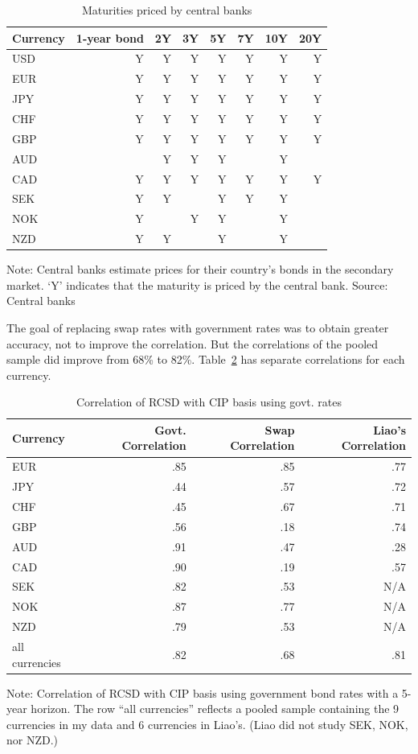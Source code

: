 \begin{table}[H]
\caption{\label{govt_maturities} Maturities priced by central banks
}
\centering
\begin{tabular}{ |l|r|r|r|r|r|r|r| }
\hline
Currency & 1-year bond & 2Y & 3Y & 5Y & 7Y & 10Y & 20Y \\
\hline
USD & Y & Y & Y & Y & Y & Y & Y \\  
EUR & Y & Y & Y & Y & Y & Y & Y \\  
JPY & Y & Y & Y & Y & Y & Y & Y \\ 
CHF & Y & Y & Y & Y & Y & Y & Y \\ 
GBP & Y & Y & Y & Y & Y & Y & Y \\ 
AUD &   & Y & Y & Y &   & Y &   \\ 
CAD & Y & Y & Y & Y & Y & Y & Y \\ 
SEK & Y & Y &   & Y & Y & Y &   \\ 
NOK & Y &   & Y & Y &   & Y &   \\ 
NZD & Y & Y &   & Y &   & Y &   \\ 
\hline
\end{tabular}

\raggedright 
 Note: {\small Central banks estimate prices for their country's bonds in the secondary market.  `Y' indicates that the maturity is priced by the central bank.}
\newline Source: Central banks
\end{table}

The goal of replacing swap rates with government rates was to obtain greater accuracy, not to improve the correlation.  But the correlations of the pooled sample did improve from 68\% to 82\%.   Table~\ref{govt_correl_table} has separate correlations for each currency.  


\begin{table}[H]
\caption{\label{govt_correl_table} Correlation of RCSD with CIP basis using govt. rates}
\centering
\begin{tabular}{ |l|r|r|r| }
\hline
Currency & Govt. Correlation & Swap Correlation & Liao's Correlation \\
\hline
EUR & .85 & .85 & .77 \\
JPY & .44 & .57 & .72 \\
CHF & .45 & .67 & .71 \\
GBP & .56 & .18 & .74 \\
AUD & .91 & .47 & .28 \\
CAD & .90 & .19 & .57 \\
SEK & .82 & .53 & N/A \\
NOK & .87 & .77 & N/A \\
NZD & .79 & .53 & N/A \\
all currencies & .82 & .68 & .81 \\  %
\hline
\end{tabular}

\raggedright 
 Note: {\small Correlation of RCSD with CIP basis using government bond rates with a 5-year horizon.  The row ``all currencies'' reflects a pooled sample containing the 9 currencies in my data and 6 currencies in Liao's.  (Liao did not study SEK, NOK, nor NZD.)}
\end{table}


